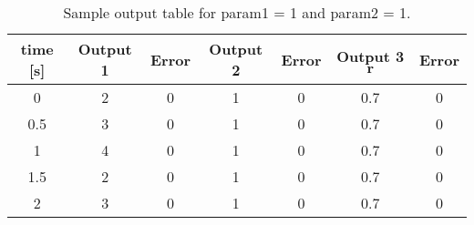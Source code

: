 \begin{table}[htbp]
\caption{Sample output table for param1 = 1 and param2 = 1.}
\label{tbl:test11}
\centering
\begin{tabular}{ccccccc}
\hline
  time [s]  &  Output 1  &  Error  &  Output 2  &  Error  &  Output 3 $\bm r$  &  Error  \\
\hline
     0      &     2      &    0    &     1      &    0    &        0.7         &    0    \\
    0.5     &     3      &    0    &     1      &    0    &        0.7         &    0    \\
     1      &     4      &    0    &     1      &    0    &        0.7         &    0    \\
    1.5     &     2      &    0    &     1      &    0    &        0.7         &    0    \\
     2      &     3      &    0    &     1      &    0    &        0.7         &    0    \\
\hline
\end{tabular}\end{table}
